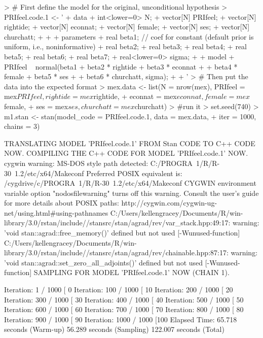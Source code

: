 \documentclass[12pt]{article}
\begin{document}
\begin{enumerate}
\begin{Schunk}
\begin{Sinput}
> # First define the model for the original, unconditional hypothesis
> PRIfeel.code.1 <- '
+     data {
+         int<lower=0> N;
+         vector[N] PRIfeel;
+         vector[N] rightide;
+         vector[N] econnat;
+         vector[N] female;
+         vector[N] ses;
+         vector[N] churchatt;
+     }
+    
+     parameters {                
+         real beta1;             // coef for constant (default prior is uniform, i.e., noninformative)
+         real beta2;             
+         real beta3;
+         real beta4;
+         real beta5;
+         real beta6;
+         real beta7;
+         real<lower=0> sigma;
+     }
+     model {
+         PRIfeel ~ normal(beta1 + beta2 * rightide + beta3 * econnat +
+                              beta4 * female + beta5 * ses +
+                              beta6 * churchatt, sigma);
+     }
+ '
> # Then put the data into the expected format
> mex.data <- list(N = nrow(mex), PRIfeel = mex$PRIfeel, rightide = mex$rightide,
+                    econnat = mex$econnat, female = mex$female, 
+                    ses = mex$ses, churchatt = mex$churchatt)
> #run it
> set.seed(740)
> m1.stan <- stan(model_code = PRIfeel.code.1, data = mex.data, 
+                 iter = 1000, chains = 3)
\end{Sinput}
\begin{Soutput}
TRANSLATING MODEL 'PRIfeel.code.1' FROM Stan CODE TO C++ CODE NOW.
COMPILING THE C++ CODE FOR MODEL 'PRIfeel.code.1' NOW.
cygwin warning:
  MS-DOS style path detected: C:/PROGRA~1/R/R-30~1.2/etc/x64/Makeconf
  Preferred POSIX equivalent is: /cygdrive/c/PROGRA~1/R/R-30~1.2/etc/x64/Makeconf
  CYGWIN environment variable option "nodosfilewarning" turns off this warning.
  Consult the user's guide for more details about POSIX paths:
    http://cygwin.com/cygwin-ug-net/using.html#using-pathnames
C:/Users/kellengracey/Documents/R/win-library/3.0/rstan/include//stansrc/stan/agrad/rev/var_stack.hpp:49:17: warning: 'void stan::agrad::free_memory()' defined but not used [-Wunused-function]
C:/Users/kellengracey/Documents/R/win-library/3.0/rstan/include//stansrc/stan/agrad/rev/chainable.hpp:87:17: warning: 'void stan::agrad::set_zero_all_adjoints()' defined but not used [-Wunused-function]
SAMPLING FOR MODEL 'PRIfeel.code.1' NOW (CHAIN 1).

Iteration:   1 / 1000 [  0%
Iteration: 100 / 1000 [ 10%
Iteration: 200 / 1000 [ 20%
Iteration: 300 / 1000 [ 30%
Iteration: 400 / 1000 [ 40%
Iteration: 500 / 1000 [ 50%
Iteration: 600 / 1000 [ 60%
Iteration: 700 / 1000 [ 70%
Iteration: 800 / 1000 [ 80%
Iteration: 900 / 1000 [ 90%
Iteration: 1000 / 1000 [100%
Elapsed Time: 65.718 seconds (Warm-up)
              56.289 seconds (Sampling)
              122.007 seconds (Total)


\end{Soutput}
\end{Schunk}
\end{enumerate}
\end{document}

